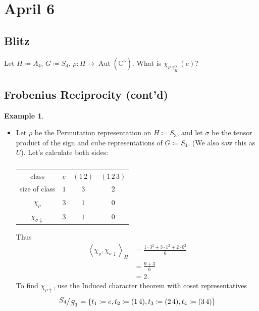 \documentclass[12pt]{article}
\newcommand{\cx}{\mathbb{C}}
\newcommand\setb[1]{\left \{ #1 \right \}}
\newcommand{\vbrack}[1]{\left \langle #1 \right \rangle}
\newcommand{\quotient}[2]{{\makebox[\width-2.3pt][l]{\raisebox{.2em}{$#1$}}\left/\raisebox{-.2em}{$#2$}\right.}}
\theoremstyle{definition}
\newtheorem{example}{Example}[section]
\DeclareMathOperator\Aut{Aut}
\begin{document}
\section{April 6}
\subsection{Blitz}
Let $H \coloneqq  A_4$, $G \coloneqq  S_4$, $\rho : H \to \Aut(\cx^5)$. What is $\chi_{\rho \uparrow_H^G}(e)$?
\subsection{Frobenius Reciprocity (cont'd)}
\begin{example}
    \noindent
    \begin{itemize}
        \item Let $\rho$ be the Permutation representation on $H \coloneqq  S_3$, and let $\sigma$ be the tensor product of the sign and cube representations of $G \coloneqq  S_4$. (We also saw this as $U$). Let's calculate both sides:
        \begin{table}[H]
            \centering
            \begin{tabular}{|| c | c | c | c ||}
                \hline
                class & $e$ & $(1\,2)$ & $(1\,2\,3)$ \\
                size of class & $1$ & $3$ & $2$ \\
                \hline
                $\chi_{\rho}$ & $3$ & $1$ & $0$ \\
                $\chi_{\sigma \downarrow}$ & $3$ & $1$ & $0$ \\
                \hline
            \end{tabular}
            \caption{}
            \label{tab:Table9}
        \end{table}
        Thus 
        \begin{equation}
            \begin{split}
                \vbrack{ \chi_{\rho} , \chi_{\sigma \downarrow} }_H & = \frac{1 \cdot 3^2 + 3 \cdot 1^2 + 2 \cdot 0^2}{6} \\
                & = \frac{9 + 3}{6} \\
                & = \boxed{2.}
            \end{split}
        \end{equation}
        To find $\chi_{\rho \uparrow}$, use the Induced character theorem with coset representatives
        \begin{equation}
            \quotient{S_4}{S_3} = \setb{t_1 \coloneqq  e , t_2 \coloneqq  (1\,4) , t_3 \coloneqq  (2\,4) , t_4 \coloneqq  (3\,4)}

\end{equation}
\end{itemize}
\end{example}
\end{document}
